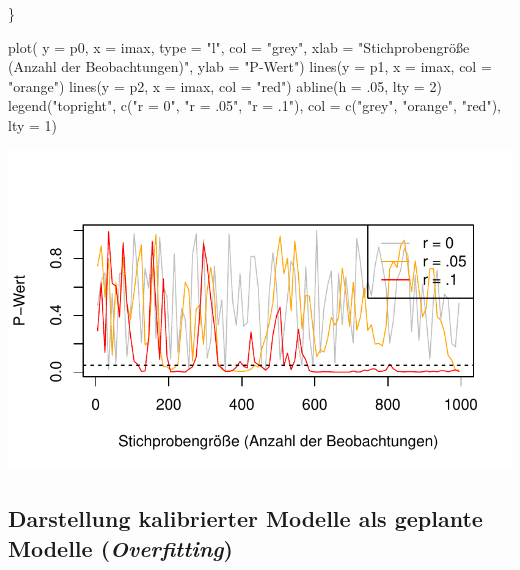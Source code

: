 \documentclass[
  letterpaper,
  DIV=11,
  numbers=noendperiod]{scrreprt}
\newenvironment{Shaded}{\begin{snugshade}}{\end{snugshade}}
\newcommand{\AttributeTok}[1]{\textcolor[rgb]{0.40,0.45,0.13}{#1}}
\newcommand{\DecValTok}[1]{\textcolor[rgb]{0.68,0.00,0.00}{#1}}
\newcommand{\FunctionTok}[1]{\textcolor[rgb]{0.28,0.35,0.67}{#1}}
\newcommand{\NormalTok}[1]{\textcolor[rgb]{0.00,0.23,0.31}{#1}}
\newcommand{\StringTok}[1]{\textcolor[rgb]{0.13,0.47,0.30}{#1}}
\begin{document}
\begin{Shaded}
\begin{Highlighting}[]
\NormalTok{\} }

\FunctionTok{plot}\NormalTok{( }\AttributeTok{y =}\NormalTok{ p0, }\AttributeTok{x =}\NormalTok{ imax, }\AttributeTok{type =} \StringTok{"l"}\NormalTok{, }\AttributeTok{col =} \StringTok{"grey"}\NormalTok{, }\AttributeTok{xlab =} \StringTok{"Stichprobengröße (Anzahl der Beobachtungen)"}\NormalTok{, }\AttributeTok{ylab =} \StringTok{"P{-}Wert"}\NormalTok{) }
\FunctionTok{lines}\NormalTok{(}\AttributeTok{y =}\NormalTok{ p1, }\AttributeTok{x =}\NormalTok{ imax, }\AttributeTok{col =} \StringTok{"orange"}\NormalTok{) }
\FunctionTok{lines}\NormalTok{(}\AttributeTok{y =}\NormalTok{ p2, }\AttributeTok{x =}\NormalTok{ imax, }\AttributeTok{col =} \StringTok{"red"}\NormalTok{) }
\FunctionTok{abline}\NormalTok{(}\AttributeTok{h =}\NormalTok{ .}\DecValTok{05}\NormalTok{, }\AttributeTok{lty =} \DecValTok{2}\NormalTok{)}
\FunctionTok{legend}\NormalTok{(}\StringTok{"topright"}\NormalTok{, }\FunctionTok{c}\NormalTok{(}\StringTok{"r = 0"}\NormalTok{, }\StringTok{"r = .05"}\NormalTok{, }\StringTok{"r = .1"}\NormalTok{), }\AttributeTok{col =} \FunctionTok{c}\NormalTok{(}\StringTok{"grey"}\NormalTok{, }\StringTok{"orange"}\NormalTok{, }\StringTok{"red"}\NormalTok{), }\AttributeTok{lty =} \DecValTok{1}\NormalTok{)}
\end{Highlighting}
\end{Shaded}

\includegraphics{probleme_methoden_files/figure-pdf/unnamed-chunk-5-1.pdf}

\subsection{\texorpdfstring{Darstellung kalibrierter Modelle als
geplante Modelle
(\emph{Overfitting})}{Darstellung kalibrierter Modelle als geplante Modelle (Overfitting)}}\label{darstellung-kalibrierter-modelle-als-geplante-modelle-overfitting}
\end{document}
